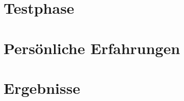 \chapter{Testphase}
\renewcommand{\kapitelautor}{}

\chapter{Persönliche Erfahrungen}

\chapter{Ergebnisse}
